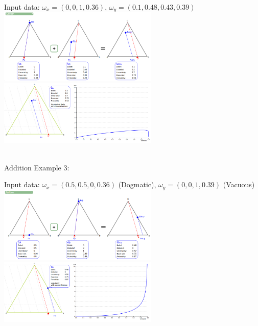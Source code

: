 \documentclass[UTF8]{article}
\newcommand{\opinion}[5]{$\omega_{#1} = (#2, #3, #4, #5)$}
\begin{document}
    \begin{center}
        Input data: 
        \opinion{x}{0}{0}{1}{0.36}, 
        \opinion{y}{0.1}{0.48}{0.43}{0.39}\\
        \includegraphics[width=3in]{images/add2.png}
        \includegraphics[width=3in]{images/add2viz.png}
    \end{center}
    \hrulefill\\
Addition Example 3:
    \begin{center}
        Input data: 
        \opinion{x}{0.5}{0.5}{0}{0.36} (Dogmatic), 
        \opinion{y}{0}{0}{1}{0.39} (Vacuous)\\
        \includegraphics[width=3in]{images/add3.png}
        \includegraphics[width=3in]{images/add3viz.png}
    \end{center}
\end{document}
